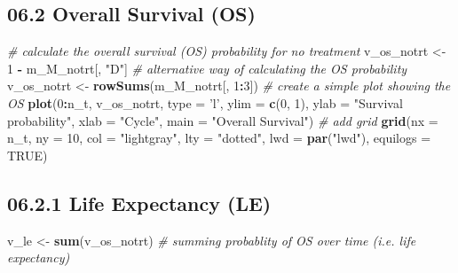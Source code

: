 \documentclass[
]{article}
\newenvironment{Shaded}{\begin{snugshade}}{\end{snugshade}}
\newcommand{\CommentTok}[1]{\textcolor[rgb]{0.56,0.35,0.01}{\textit{#1}}}
\newcommand{\DataTypeTok}[1]{\textcolor[rgb]{0.13,0.29,0.53}{#1}}
\newcommand{\DecValTok}[1]{\textcolor[rgb]{0.00,0.00,0.81}{#1}}
\newcommand{\KeywordTok}[1]{\textcolor[rgb]{0.13,0.29,0.53}{\textbf{#1}}}
\newcommand{\NormalTok}[1]{#1}
\newcommand{\OperatorTok}[1]{\textcolor[rgb]{0.81,0.36,0.00}{\textbf{#1}}}
\newcommand{\OtherTok}[1]{\textcolor[rgb]{0.56,0.35,0.01}{#1}}
\newcommand{\StringTok}[1]{\textcolor[rgb]{0.31,0.60,0.02}{#1}}
\begin{document}
\hypertarget{overall-survival-os}{%
\subsection{06.2 Overall Survival (OS)}\label{overall-survival-os}}

\begin{Shaded}
\begin{Highlighting}[]
\CommentTok{# calculate the overall survival (OS) probability for no treatment}
\NormalTok{v_os_notrt <-}\StringTok{ }\DecValTok{1} \OperatorTok{-}\StringTok{ }\NormalTok{m_M_notrt[, }\StringTok{"D"}\NormalTok{]    }
\CommentTok{# alternative way of calculating the OS probability   }
\NormalTok{v_os_notrt <-}\StringTok{ }\KeywordTok{rowSums}\NormalTok{(m_M_notrt[, }\DecValTok{1}\OperatorTok{:}\DecValTok{3}\NormalTok{])  }
\CommentTok{# create a simple plot showing the OS}
\KeywordTok{plot}\NormalTok{(}\DecValTok{0}\OperatorTok{:}\NormalTok{n_t, v_os_notrt, }\DataTypeTok{type =} \StringTok{'l'}\NormalTok{, }
     \DataTypeTok{ylim =} \KeywordTok{c}\NormalTok{(}\DecValTok{0}\NormalTok{, }\DecValTok{1}\NormalTok{),}
     \DataTypeTok{ylab =} \StringTok{"Survival probability"}\NormalTok{,}
     \DataTypeTok{xlab =} \StringTok{"Cycle"}\NormalTok{,}
     \DataTypeTok{main =} \StringTok{"Overall Survival"}\NormalTok{)          }
\CommentTok{# add grid }
\KeywordTok{grid}\NormalTok{(}\DataTypeTok{nx =}\NormalTok{ n_t, }\DataTypeTok{ny =} \DecValTok{10}\NormalTok{, }\DataTypeTok{col =} \StringTok{"lightgray"}\NormalTok{, }\DataTypeTok{lty =} \StringTok{"dotted"}\NormalTok{, }\DataTypeTok{lwd =} \KeywordTok{par}\NormalTok{(}\StringTok{"lwd"}\NormalTok{), }
     \DataTypeTok{equilogs =} \OtherTok{TRUE}\NormalTok{) }
\end{Highlighting}
\end{Shaded}

\hypertarget{life-expectancy-le}{%
\subsection{06.2.1 Life Expectancy (LE)}\label{life-expectancy-le}}

\begin{Shaded}
\begin{Highlighting}[]
\NormalTok{v_le <-}\StringTok{ }\KeywordTok{sum}\NormalTok{(v_os_notrt)     }\CommentTok{# summing probablity of OS over time  (i.e. life expectancy)}
\end{Highlighting}
\end{Shaded}
\end{document}
